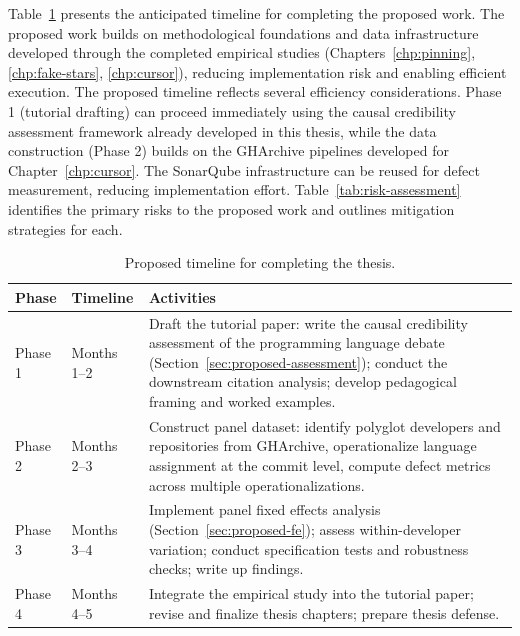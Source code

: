 Table~\ref{tab:proposed-timeline} presents the anticipated timeline for completing the proposed work.
The proposed work builds on methodological foundations and data infrastructure developed through the completed empirical studies (Chapters~\ref{chp:pinning}, \ref{chp:fake-stars}, \ref{chp:cursor}), reducing implementation risk and enabling efficient execution.
The proposed timeline reflects several efficiency considerations.
Phase 1 (tutorial drafting) can proceed immediately using the causal credibility assessment framework already developed in this thesis, while the data construction (Phase 2) builds on the GHArchive pipelines developed for Chapter~\ref{chp:cursor}.
The SonarQube infrastructure can be reused for defect measurement, reducing implementation effort.
Table~\ref{tab:risk-assessment} identifies the primary risks to the proposed work and outlines mitigation strategies for each.

\begin{table}[h]
\centering
\small
\caption{Proposed timeline for completing the thesis.}
\label{tab:proposed-timeline}
\begin{tabular}{llp{12cm}}
\toprule
\textbf{Phase} & \textbf{Timeline} & \textbf{Activities} \\
\midrule
Phase 1 & Months 1--2 & Draft the tutorial paper: write the causal credibility assessment of the programming language debate (Section~\ref{sec:proposed-assessment}); conduct the downstream citation analysis; develop pedagogical framing and worked examples. \\
\addlinespace
Phase 2 & Months 2--3 & Construct panel dataset: identify polyglot developers and repositories from GHArchive, operationalize language assignment at the commit level, compute defect metrics across multiple operationalizations. \\
\addlinespace
Phase 3 & Months 3--4 & Implement panel fixed effects analysis (Section~\ref{sec:proposed-fe}); assess within-developer variation; conduct specification tests and robustness checks; write up findings. \\
\addlinespace
Phase 4 & Months 4--5 & Integrate the empirical study into the tutorial paper; revise and finalize thesis chapters; prepare thesis defense. \\
\bottomrule
\end{tabular}
\end{table}

